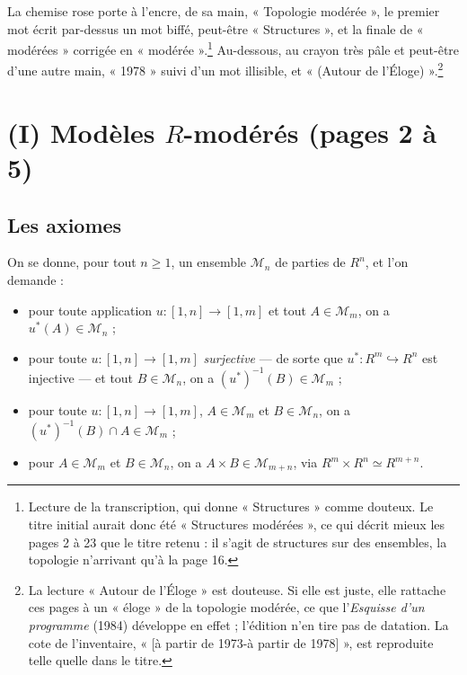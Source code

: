 \documentclass[11pt,a4paper]{article}
\begin{document}
La chemise rose porte à l'encre, de sa main, « Topologie modérée », le premier
mot écrit par-dessus un mot biffé, peut-être « Structures », et la finale de
« modérées » corrigée en « modérée ».\footnote{Lecture de la transcription,
qui donne « Structures » comme douteux. Le titre initial aurait donc été
« Structures modérées », ce qui décrit mieux les pages 2 à 23 que le titre
retenu : il s'agit de structures sur des ensembles, la topologie n'arrivant
qu'à la page 16.} Au-dessous, au crayon très pâle et peut-être d'une autre
main, « 1978 » suivi d'un mot illisible, et « (Autour de l'Éloge) ».\footnote{La
lecture « Autour de l'Éloge » est douteuse. Si elle est juste, elle rattache
ces pages à un « éloge » de la topologie modérée, ce que l'\emph{Esquisse d'un
programme} (1984) développe en effet ; l'édition n'en tire pas de datation.
La cote de l'inventaire, « [à partir de 1973-à partir de 1978] », est
reproduite telle quelle dans le titre.}

\section*{(I) Modèles $R$-modérés (pages 2 à 5)}

\subsection*{Les axiomes}

On se donne, pour tout $n \geqslant 1$, un ensemble $\mathcal{M}_n$ de parties
de $R^n$, et l'on demande :

\begin{itemize}
\item[(M1)] pour toute application $u : [1,n] \to [1,m]$ et tout $A \in
  \mathcal{M}_m$, on a $u^*(A) \in \mathcal{M}_n$ ;
\item[(M2)] pour toute $u : [1,n] \to [1,m]$ \emph{surjective} — de sorte que
  $u^* : R^m \hookrightarrow R^n$ est injective — et tout $B \in
  \mathcal{M}_n$, on a $(u^*)^{-1}(B) \in \mathcal{M}_m$ ;
\item[(M3)] pour toute $u : [1,n] \to [1,m]$, $A \in \mathcal{M}_m$ et $B \in
  \mathcal{M}_n$, on a $(u^*)^{-1}(B) \cap A \in \mathcal{M}_m$ ;
\item[(M4)] pour $A \in \mathcal{M}_m$ et $B \in \mathcal{M}_n$, on a $A
  \times B \in \mathcal{M}_{m+n}$, via $R^m \times R^n \simeq R^{m+n}$.
\end{itemize}
\end{document}

